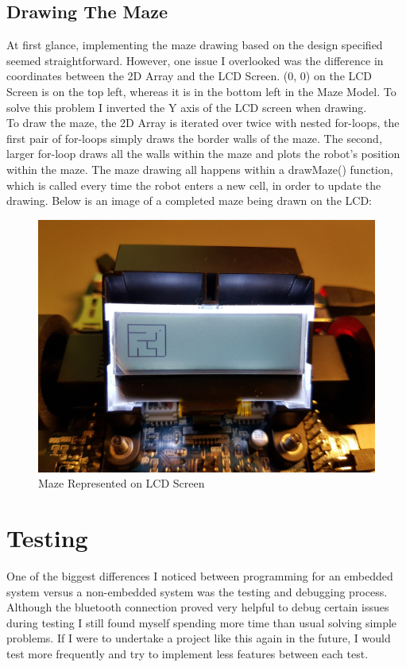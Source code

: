 \documentclass[a4paper]{article}
\begin{document}
	\newpage
	
	\subsection{Drawing The Maze}
	At first glance, implementing the maze drawing based on the design specified seemed straightforward. However, one issue I overlooked was the difference in coordinates between the 2D Array and the LCD Screen. (0, 0) on the LCD Screen is on the top left, whereas it is in the bottom left in the Maze Model. To solve this problem I inverted the Y axis of the LCD screen when drawing.\\
	
	To draw the maze, the 2D Array is iterated over twice with nested for-loops, the first pair of for-loops simply draws the border walls of the maze. The second, larger for-loop draws all the walls within the maze and plots the robot's position within the maze. The maze drawing all happens within a drawMaze() function, which is called every time the robot enters a new cell, in order to update the drawing. Below is an image of a completed maze being drawn on the LCD: 
	
	\begin{figure}[!htb]
		\centering
			\includegraphics[width=0.5\linewidth]{./img/maze.jpg}
			\caption{Maze Represented on LCD Screen}
			\label{fig:maze-draw}
	\end{figure}
	
	\section{Testing}
	One of the biggest differences I noticed between programming for an embedded system versus a non-embedded system was the testing and debugging process. Although the bluetooth connection proved very helpful to debug certain issues during testing I still found myself spending more time than usual solving simple problems. If I were to undertake a project like this again in the future, I would test more frequently and try to implement less features between each test.\\
	
\end{document}
